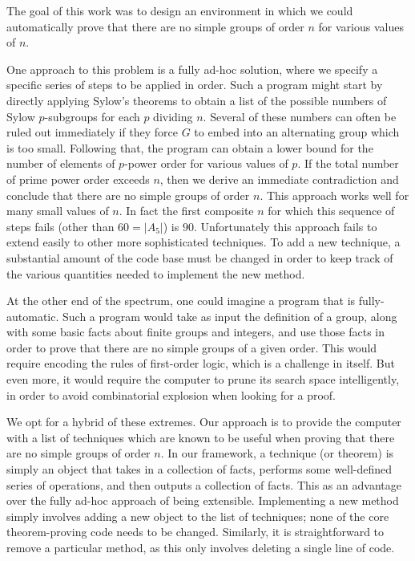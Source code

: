 \documentclass[11pt, oneside]{article}   	%
\begin{document}
The goal of this work was to design an environment in which we could automatically prove that there are no simple groups of order $n$ for various values of $n$.  

One approach to this problem is a fully ad-hoc solution, where we specify a specific series of steps to be applied in order.  Such a program might start by directly applying Sylow's theorems to obtain a list of the possible numbers of Sylow $p$-subgroups for each $p$ dividing $n$.  Several of these numbers can often be ruled out immediately if they force $G$ to embed into an alternating group which is too small.  Following that, the program can obtain a lower bound for the number of elements of $p$-power order for various values of $p$.  If the total number of prime power order exceeds $n$, then we derive an immediate contradiction and conclude that there are no simple groups of order $n$.  This approach works well for many small values of $n$.  In fact the first composite $n$ for which this sequence of steps fails (other than $60 = |A_5|$) is $90.$ Unfortunately this approach fails to extend easily to other more sophisticated techniques.  To add a new technique, a substantial amount of the code base must be changed in order to keep track of the various quantities needed to implement the new method.

At the other end of the spectrum, one could imagine a program that is fully-automatic.  Such a program would take as input the definition of a group, along with some basic facts about finite groups and integers, and use those facts in order to prove that there are no simple groups of a given order.  This would require encoding the rules of first-order logic, which is a challenge in itself.  But even more, it would require the computer to prune its search space intelligently, in order to avoid combinatorial explosion when looking for a proof.

We opt for a hybrid of these extremes.  Our approach is to provide the computer with a list of techniques which are known to be useful when proving that there are no simple groups of order $n$.  In our framework, a technique (or theorem) is simply an object that takes in a collection of facts, performs some well-defined series of operations, and then outputs a collection of facts.  This as an advantage over the fully ad-hoc approach of being extensible. Implementing a new method simply involves adding a new object to the list of techniques; none of the core theorem-proving code needs to be changed.  Similarly, it is straightforward to remove a particular method, as this only involves deleting a single line of code.
\end{document}
